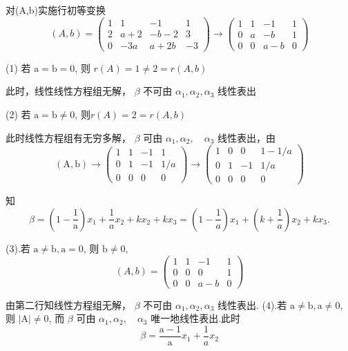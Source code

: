 \documentclass{article}
\begin{document}
对(A,b)实施行初等变换
$$
    (A, b)=\left(\begin{array}{cccc}
            1 & 1    & -1    & 1  \\
            2 & a+2  & -b-2  & 3  \\
            0 & -3 a & a+2 b & -3
        \end{array}\right) \rightarrow\left(\begin{array}{cccc}
            1 & 1 & -1  & 1 \\
            0 & a & -b  & 1 \\
            0 & 0 & a-b & 0
        \end{array}\right)
$$

(1) 若 $\mathrm{a}=\mathrm{b}=0$, 则 $r(A)=1 \neq 2=r(A, b)$

此时，线性线性方程组无解， $\beta$ 不可由 $\alpha_{1}, \alpha_{2}, \alpha_{3}$ 线性表出

(2) 若 $\mathrm{a}=\mathrm{b} \neq 0$, 则$r(A)=2=r(A, b)$

此时线性方程组有无穷多解， $\beta$ 可由 $\alpha_{1}, \alpha_{2}, \quad \alpha_{3}$ 线性表出，由
$$(\mathrm{A}, \mathrm{b}) \rightarrow\left(\begin{array}{cccc}1 & 1 & -1 & 1 \\ 0 & 1 & -1 & 1 / a \\ 0 & 0 & 0 & 0\end{array}\right) \rightarrow\left(\begin{array}{cccc}1 & 0 & 0 & 1-1 / a \\ 0 & 1 & -1 & 1 / a \\ 0 & 0 & 0 & 0\end{array}\right)$$

知
$$\beta=\left(1-\frac{1}{\mathrm{a}}\right) x_{1}+\frac{1}{a} x_{2}+k x_{2}+k x_{3}=\left(1-\frac{1}{a}\right) x_{1}+\left(k+\frac{1}{a}\right) x_{2}+k x_{3} .$$

(3).若 $\mathrm{a} \neq \mathrm{b}, \mathrm{a}=0$, 则 $\mathrm{b} \neq 0$,
$$
    (A, b)=\left(\begin{array}{cccc}
            1 & 1 & -1  & 1 \\
            0 & 0 & 0   & 1 \\
            0 & 0 & a-b & 0
        \end{array}\right)
$$

由第二行知线性方程组无解， $\beta$ 不可由 $\alpha_{1}, \alpha_{2}, \alpha_{3}$ 线性表出.
(4).若 $\mathrm{a} \neq \mathrm{b}, \mathrm{a} \neq 0$, 则 $|\mathrm{A}| \neq 0$, 而 $\beta$ 可由 $\alpha_{1}, \alpha_{2}, \quad \alpha_{3}$ 唯一地线性表出.此时
$$
    \beta=\frac{\mathrm{a}-1}{\mathrm{a}} x_{1}+\frac{1}{a} x_{2}
$$
\end{document}
